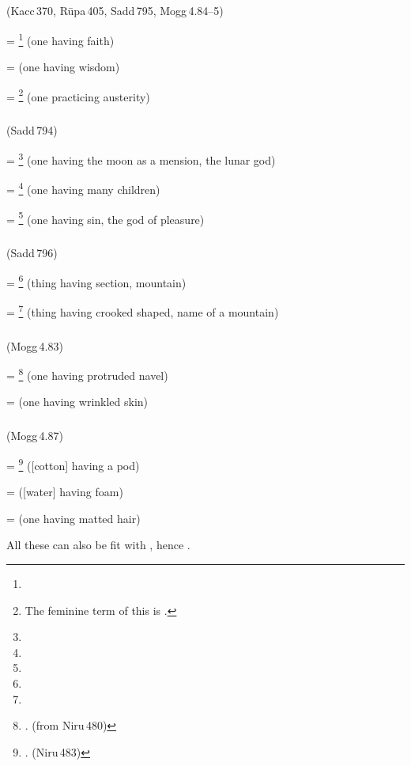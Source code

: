 \subparagraph*{} (Kacc\,370, R\=upa\,405, Sadd\,795, Mogg\,4.84--5)\label{pacct10:K-dna}\label{pacct10:a}

 = \footnote{} (one having faith) \par
{} =  (one having wisdom) \par
{} = \footnote{The feminine term of this is .} (one practicing austerity) \par

\subparagraph*{} (Sadd\,794)\label{pacct10:imantu}

 = \footnote{} (one having the moon as a mension, the lunar god) \par
{} = \footnote{} (one having many children) \par
{} = \footnote{} (one having sin, the god of pleasure) \par

\subparagraph*{} (Sadd\,796)\label{pacct10:ta}

 = \footnote{} (thing having section, mountain) \par
{} = \footnote{} (thing having crooked shaped, name of a mountain) \par

\subparagraph*{} (Mogg\,4.83)\label{pacct10:bha}

 = \footnote{. (from Niru\,480)} (one having protruded navel) \par
{} =  (one having wrinkled skin) \par

\subparagraph*{} (Mogg\,4.87)\label{pacct10:lla}

 = \footnote{. (Niru\,483)} ([cotton] having a pod) \par
{} =  ([water] having foam) \par
{} =  (one having matted hair) \par
All these can also be fit with , hence .

